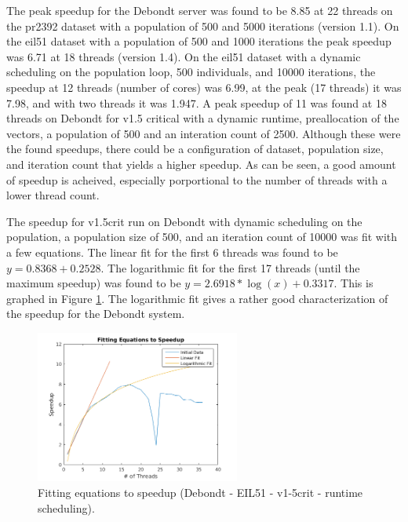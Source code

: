 \documentclass[10pt,letterpaper]{article}
\begin{document}
The peak speedup for the Debondt server was found to be 8.85 at 22 threads on the pr2392 dataset with a population of 500 and 5000 iterations (version 1.1). On the eil51 dataset with a population of 500 and 1000 iterations the peak speedup was 6.71 at 18 threads (version 1.4). On the eil51 dataset with a dynamic scheduling on the population loop, 500 individuals, and 10000 iterations, the speedup at 12 threads (number of cores) was 6.99, at the peak (17 threads) it was 7.98, and with two threads it was 1.947. A peak speedup of 11 was found at 18 threads on Debondt for v1.5 critical with a dynamic runtime, preallocation of the vectors, a population of 500 and an interation count of 2500. Although these were the found speedups, there could be a configuration of dataset, population size, and iteration count that yields a higher speedup. As can be seen, a good amount of speedup is acheived, especially porportional to the number of threads with a lower thread count. 

The speedup for v1.5crit run on Debondt with dynamic scheduling on the population, a population size of 500, and an iteration count of 10000 was fit with a few equations. The linear fit for the first 6 threads was found to be $ y = 0.8368 + 0.2528 $. The logarithmic fit for the first 17 threads (until the maximum speedup) was found to be $y = 2.6918*\log(x) + 0.3317$. This is graphed in Figure \ref{fig:linefits}. The logarithmic fit gives a rather good characterization of the speedup for the Debondt system.

\begin{figure}
\centering
\includegraphics[width=0.6\textwidth]{../img/Debondt_fitting_v1-5crit_runtimepop.png} 
\caption{Fitting equations to speedup (Debondt - EIL51 - v1-5crit - runtime scheduling).}
\label{fig:linefits}
\end{figure}
\end{document}
